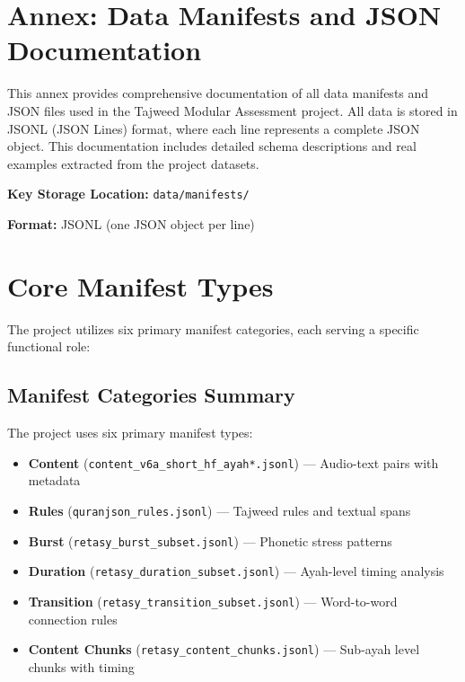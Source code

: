 
\section{Annex: Data Manifests and JSON Documentation}

This annex provides comprehensive documentation of all data manifests and JSON files used in the Tajweed Modular Assessment project. All data is stored in JSONL (JSON Lines) format, where each line represents a complete JSON object. This documentation includes detailed schema descriptions and real examples extracted from the project datasets.

\textbf{Key Storage Location:} \texttt{data/manifests/}

\textbf{Format:} JSONL (one JSON object per line)

\newpage

\section{Core Manifest Types}

The project utilizes six primary manifest categories, each serving a specific functional role:

\subsection*{Manifest Categories Summary}

The project uses six primary manifest types:

\begin{itemize}
  \item \textbf{Content} (\texttt{content\_v6a\_short\_hf\_ayah*.jsonl}) — Audio-text pairs with metadata
  \item \textbf{Rules} (\texttt{quranjson\_rules.jsonl}) — Tajweed rules and textual spans
  \item \textbf{Burst} (\texttt{retasy\_burst\_subset.jsonl}) — Phonetic stress patterns
  \item \textbf{Duration} (\texttt{retasy\_duration\_subset.jsonl}) — Ayah-level timing analysis
  \item \textbf{Transition} (\texttt{retasy\_transition\_subset.jsonl}) — Word-to-word connection rules
  \item \textbf{Content Chunks} (\texttt{retasy\_content\_chunks.jsonl}) — Sub-ayah level chunks with timing
\end{itemize}

\newpage

